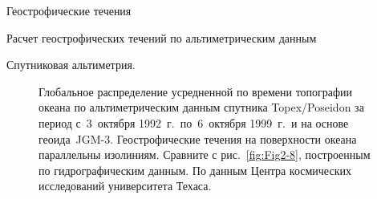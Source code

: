 \begin{chapter}{Геострофические течения}
\begin{section}{Расчет геострофических течений по альтиметрическим данным}
\begin{paragraph}{Спутниковая альтиметрия.}
\begin{figure}[t!]
\caption{Глобальное распределение усредненной по времени топографии океана
по альтиметрическим данным спутника Topex/Poseidon за период
с~3~октября 1992~г.\ по~6~октября 1999~г.\ и на основе 
геоида~JGM-3. Геострофические течения на поверхности 
океана параллельны
изолиниям. Сравните с рис.~\ref{fig:Fig2-8}, построенным по гидрографическим
данным. По данным Центра космических 
исследований университета Техаса.}
\label{fig:sshmean}
\vspace{-4ex}
\end{figure}
%


\end{paragraph}
\end{section}
\end{chapter}

